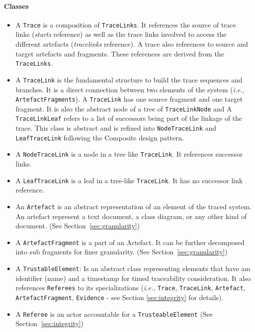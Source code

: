 \paragraph{Classes}
\begin{itemize}
    \item A \texttt{Trace} is a composition of \texttt{TraceLinks}. It references the source of trace links (\textit{starts} reference) as well as the trace links involved to access the different artefacts (\textit{tracelinks} reference). 
    A trace also references to source and target artefacts and fragments. These references are derived from the \texttt{TraceLinks}.
    \item A \texttt{TraceLink} is the fundamental structure to build the trace sequences and branches. It is a direct connection between two elements of the system (\textit{i.e.,} \texttt{ArtefactFragments}). A \texttt{TraceLink} has one source fragment and one target fragment. It is also the abstract node of a tree of \texttt{TraceLinkNode} and A \texttt{TraceLinkLeaf} refers to a list of successors being part of the linkage of the trace. This class is abstract and is refined into \texttt{NodeTraceLink} and \texttt{LeafTraceLink} following the Composite design pattern.
    \item A \texttt{NodeTraceLink} is a node in a tree like \texttt{TraceLink}. It references successor links.
    \item A \texttt{LeafTraceLink} is a leaf in a tree-like \texttt{TraceLink}. It has no successor link reference.
    \item An \texttt{Artefact} is an abstract representation of an element of the traced system. An artefact represent a text document, a class diagram, or any other kind of document. (See Section~\ref{sec:granularity})
    \item A \texttt{ArtefactFragment} is a part of an Artefact. It can be further decomposed into sub fragments for finer granularity. (See Section~\ref{sec:granularity})
    \item A \texttt{TrustableElement}: Is an abstract class representing elements that have am identifier (name) and a timestamp for timed traceability consideration. It also references \texttt{Referees} to its specializations (\textit{i.e.,} \texttt{Trace}, \texttt{TraceLink}, \texttt{Artefact}, \texttt{ArtefactFragment}, \texttt{Evidence} - see Section \ref{sec:integrity} for details).
    \item A \texttt{Referee} is an actor accountable for a \texttt{TrusteableElement} (See Section~\ref{sec:integrity})
\end{itemize} 

